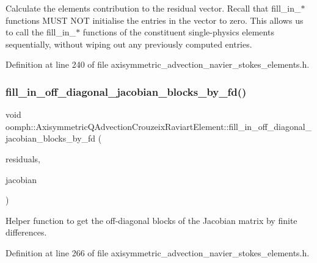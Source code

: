 Calculate the element\textquotesingle{}s contribution to the residual vector. Recall that fill\+\_\+in\+\_\+$\ast$ functions M\+U\+ST N\+OT initialise the entries in the vector to zero. This allows us to call the fill\+\_\+in\+\_\+$\ast$ functions of the constituent single-\/physics elements sequentially, without wiping out any previously computed entries. 



Definition at line 240 of file axisymmetric\+\_\+advection\+\_\+navier\+\_\+stokes\+\_\+elements.\+h.

\mbox{\label{classoomph_1_1AxisymmetricQAdvectionCrouzeixRaviartElement_aad2c85645b11da350f13cf1087f5b46a}} 
\subsubsection{\texorpdfstring{fill\+\_\+in\+\_\+off\+\_\+diagonal\+\_\+jacobian\+\_\+blocks\+\_\+by\+\_\+fd()}{fill\_in\_off\_diagonal\_jacobian\_blocks\_by\_fd()}}
{\footnotesize\ttfamily void oomph\+::\+Axisymmetric\+Q\+Advection\+Crouzeix\+Raviart\+Element\+::fill\+\_\+in\+\_\+off\+\_\+diagonal\+\_\+jacobian\+\_\+blocks\+\_\+by\+\_\+fd (\begin{DoxyParamCaption}\item[{Vector$<$ double $>$ \&}]{residuals,  }\item[{Dense\+Matrix$<$ double $>$ \&}]{jacobian }\end{DoxyParamCaption})\hspace{0.3cm}{\ttfamily [inline]}}



Helper function to get the off-\/diagonal blocks of the Jacobian matrix by finite differences. 



Definition at line 266 of file axisymmetric\+\_\+advection\+\_\+navier\+\_\+stokes\+\_\+elements.\+h.



